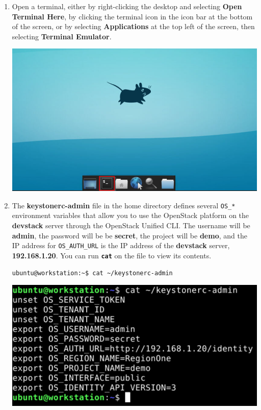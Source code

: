 \documentclass[letterpaper, 12pt]{article}
\begin{document}
\begin{enumerate}
    \item Open a terminal, either by right-clicking the desktop and selecting \textbf{Open Terminal Here}, by clicking
    the terminal icon in the icon bar at the bottom of the screen, or by selecting \textbf{Applications} at the top
    left of the screen, then selecting \textbf{Terminal Emulator}.

    \begin{center}
        \includegraphics[width=\linewidth]{images/part2/step1.png}
    \end{center}

    \item The \textbf{keystonerc-admin} file in the home directory defines several \texttt{OS\_*} environment variables
    that allow you to use the OpenStack platform on the \textbf{devstack} server through the OpenStack Unified
    CLI. The username will be \textbf{admin}, the password will be be \textbf{secret}, the project will be
    \textbf{demo}, and the IP address for \texttt{OS\_AUTH\_URL} is the IP address of the \textbf{devstack} server,
    \textbf{192.168.1.20}. You can run \textbf{\texttt{cat}} on the file to view its contents.
\begin{lstlisting}
ubuntu@workstation:~$ cat ~/keystonerc-admin
\end{lstlisting}

    \begin{center}
        \includegraphics[width=\linewidth]{images/part2/step2.png}
    \end{center}


\end{enumerate}
\end{document}
